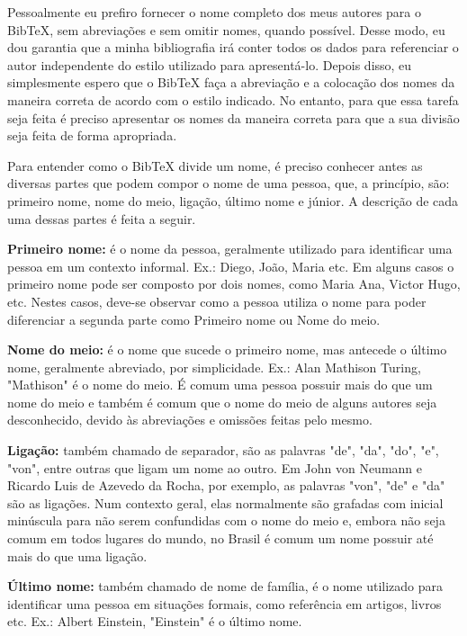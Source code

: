 \begin{anexosenv}
Pessoalmente eu prefiro fornecer o nome completo dos meus autores para o BibTeX, sem abreviações e sem omitir nomes, quando possível. Desse modo, eu dou garantia que a minha bibliografia irá conter todos os dados para referenciar o autor independente do estilo utilizado para apresentá-lo. Depois disso, eu simplesmente espero que o BibTeX faça a abreviação e a colocação dos nomes da maneira correta de acordo com o estilo indicado. No entanto, para que essa tarefa seja feita é preciso apresentar os nomes da maneira correta para que a sua divisão seja feita de forma apropriada.

Para entender como o BibTeX divide um nome, é preciso conhecer antes as diversas partes que podem compor o nome de uma pessoa, que, a princípio, são: primeiro nome, nome do meio, ligação, último nome e júnior. A descrição de cada uma dessas partes é feita a seguir.

\begin{compactitem}
	\item \textbf{Primeiro nome:} é o nome da pessoa, geralmente utilizado para identificar uma pessoa em um contexto informal. Ex.: Diego, João, Maria etc. Em alguns casos o primeiro nome pode ser composto por dois nomes, como Maria Ana, Victor Hugo, etc. Nestes casos, deve-se observar como a pessoa utiliza o nome para poder diferenciar a segunda parte como Primeiro nome ou Nome do meio.

	\item \textbf{Nome do meio:} é o nome que sucede o primeiro nome, mas antecede o último nome, geralmente abreviado, por simplicidade. Ex.: Alan Mathison Turing, "Mathison"{} é o nome do meio. É comum uma pessoa possuir mais do que um nome do meio e também é comum que o nome do meio de alguns autores seja desconhecido, devido às abreviações e omissões feitas pelo mesmo.

	\item \textbf{Ligação:} também chamado de separador, são as palavras "de"{}, "da"{}, "do"{}, "e"{}, "von"{}, entre outras que ligam um nome ao outro. Em John von Neumann e Ricardo Luis de Azevedo da Rocha, por exemplo, as palavras "von"{}, "de"{}  e "da"{}  são as ligações. Num contexto geral, elas normalmente são grafadas com inicial minúscula para não serem confundidas com o nome do meio e, embora não seja comum em todos lugares do mundo, no Brasil é comum um nome possuir até mais do que uma ligação.

	\item \textbf{Último nome:} também chamado de nome de família, é o nome utilizado para identificar uma pessoa em situações formais, como referência em artigos, livros etc. Ex.: Albert Einstein, "Einstein"{} é o último nome.


\end{compactitem}
\end{anexosenv}
